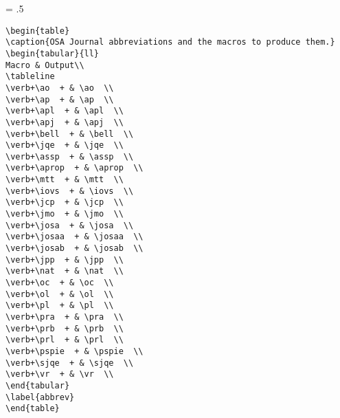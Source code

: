 \baselineskip = .5\baselineskip  %
\begin{verbatim}
\begin{table}
\caption{OSA Journal abbreviations and the macros to produce them.}
\begin{tabular}{ll}
Macro & Output\\
\tableline
\verb+\ao  + & \ao  \\
\verb+\ap  + & \ap  \\
\verb+\apl  + & \apl  \\
\verb+\apj  + & \apj  \\
\verb+\bell  + & \bell  \\
\verb+\jqe  + & \jqe  \\
\verb+\assp  + & \assp  \\
\verb+\aprop  + & \aprop  \\
\verb+\mtt  + & \mtt  \\
\verb+\iovs  + & \iovs  \\
\verb+\jcp  + & \jcp  \\
\verb+\jmo  + & \jmo  \\
\verb+\josa  + & \josa  \\
\verb+\josaa  + & \josaa  \\
\verb+\josab  + & \josab  \\
\verb+\jpp  + & \jpp  \\
\verb+\nat  + & \nat  \\
\verb+\oc  + & \oc  \\
\verb+\ol  + & \ol  \\
\verb+\pl  + & \pl  \\
\verb+\pra  + & \pra  \\
\verb+\prb  + & \prb  \\
\verb+\prl  + & \prl  \\
\verb+\pspie  + & \pspie  \\
\verb+\sjqe  + & \sjqe  \\
\verb+\vr  + & \vr  \\
\end{tabular}
\label{abbrev}
\end{table}


\end{verbatim}

